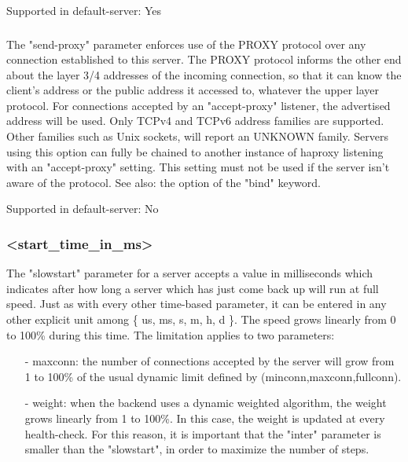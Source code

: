   Supported in default-server: Yes

\subsubsection[send-proxy]{}
  The "send-proxy" parameter enforces use of the PROXY protocol over any
  connection established to this server. The PROXY protocol informs the other
  end about the layer 3/4 addresses of the incoming connection, so that it can
  know the client's address or the public address it accessed to, whatever the
  upper layer protocol. For connections accepted by an "accept-proxy" listener,
  the advertised address will be used. Only TCPv4 and TCPv6 address families
  are supported. Other families such as Unix sockets, will report an UNKNOWN
  family. Servers using this option can fully be chained to another instance of
  haproxy listening with an "accept-proxy" setting. This setting must not be
  used if the server isn't aware of the protocol.
See also: the 
  option of the "bind" keyword.

  Supported in default-server: No

\subsubsection[slowstart]{ <start\_time\_in\_ms>}
  The "slowstart" parameter for a server accepts a value in milliseconds which
  indicates after how long a server which has just come back up will run at
  full speed. Just as with every other time-based parameter, it can be entered
  in any other explicit unit among \{ us, ms, s, m, h, d \}. The speed grows
  linearly from 0 to 100\% during this time. The limitation applies to two
  parameters:

  \begin{itemize}
  \item[-] maxconn: the number of connections accepted by the server will grow from 1
    to 100\% of the usual dynamic limit defined by (minconn,maxconn,fullconn).

  \item[-] weight: when the backend uses a dynamic weighted algorithm, the weight
    grows linearly from 1 to 100\%. In this case, the weight is updated at every
    health-check. For this reason, it is important that the "inter" parameter
    is smaller than the "slowstart", in order to maximize the number of steps.
  \end{itemize}

